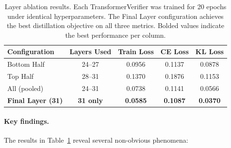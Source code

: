 \documentclass{article}
\begin{document}
\begin{table}[ht]
\centering
\caption{Layer ablation results. Each TransformerVerifier was trained for 20 epochs under identical hyperparameters. The Final Layer configuration achieves the best distillation objective on all three metrics. Bolded values indicate the best performance per column.}
\label{tab:ablation}
\vspace{3pt}
\begin{tabular}{@{}lcccc@{}}
\toprule
\textbf{Configuration} & \textbf{Layers Used} & \textbf{Train Loss} & \textbf{CE Loss} & \textbf{KL Loss} \\ \midrule
Bottom Half   & 24--27  & 0.0956 & 0.1137 & 0.0878 \\
Top Half      & 28--31  & 0.1370 & 0.1876 & 0.1153 \\
All (pooled)  & 24--31  & 0.0738 & 0.1141 & 0.0566 \\
\textbf{Final Layer (31)} & \textbf{31 only} & \textbf{0.0585} & \textbf{0.1087} & \textbf{0.0370} \\ \bottomrule
\end{tabular}
\end{table}

\paragraph{Key findings.} The results in Table~\ref{tab:ablation} reveal several non-obvious phenomena:
\end{document}
